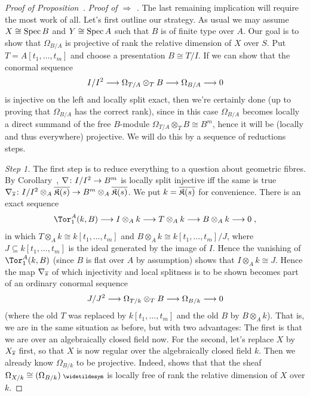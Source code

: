 \documentclass[a4paper,parskip=half,numbers=enddot, DIV=12]{scrreprt}
\begin{document}
\begin{proof}[Proof of Proposition~]
	\emph{Proof of  $\Rightarrow$ .} The last remaining implication will require the most work of all. Let's first outline our strategy. As usual we may assume $X\cong \operatorname{Spec} B$ and $Y\cong \operatorname{Spec} A$ such that $B$ is of finite type over $A$. Our goal is to show that $\Omega_{B/A}$ is projective of rank the relative dimension of $X$ over $S$. Put $T=A[t_1,\ldots,t_m]$ and choose a presentation $B\cong T/I$. If we can show that the conormal sequence
	\begin{align}\lbl{eq:conormalSeq}
		I/I^2\morphism \Omega_{T/A}\otimes_TB\morphism\Omega_{B/A}\morphism 0
	\end{align}
	is injective on the left and locally split exact, then we're certainly done (up to proving that $\Omega_{B/A}$ has the correct rank), since in this case $\Omega_{B/A}$ becomes locally a direct summand of the free $B$-module $\Omega_{T/A}\otimes_TB\cong B^m$, hence it will be (locally and thus everywhere) projective. We will do this by a sequence of reductions steps.
	
	\emph{Step 1.} The first step is to reduce everything to a question about geometric fibres. By Corollary~, $\nabla\colon I/I^2\morphism B^m$ is locally split injective iff the same is true $\nabla_{\ov{s}}\colon I/I^2\otimes_A\ov{\KK(s)}\morphism B^m\otimes_A\ov{\KK(s)}$. We put $k=\overline{\mathfrak{K}(s)}$ for convenience. There is an exact sequence
	\begin{align*}
		\Tor_1^A(k,B)\morphism I\otimes_Ak\morphism T\otimes_Ak\morphism B\otimes_Ak\morphism 0\;,
	\end{align*}
	in which $T\otimes_Ak\cong k[t_1,\ldots,t_m]$ and $B\otimes_Ak\cong k[t_1,\ldots,t_m]/J$, where $J\subseteq k[t_1,\ldots,t_m]$ is the ideal generated by the image of $I$. Hence the vanishing of $\Tor_1^A(k,B)$ (since $B$ is flat over $A$ by assumption) shows that $I\otimes_Ak\cong J$. Hence the map $\nabla_{\overline{s}}$ of which injectivity and local splitness is to be shown becomes part of an ordinary conormal sequence
	\begin{align}\lbl{eq:conormalSeq2}
		J/J^2\morphism \Omega_{T/k}\otimes_TB\morphism \Omega_{B/k}\morphism 0
	\end{align}
	 (where the old $T$ was replaced by $k[t_1,\ldots,t_m]$ and the old $B$ by $B\otimes_A k$). That is, we are in the same situation as before, but with two advantages: The first is that we are over an algebraically closed field now. For the second, let's replace $X$ by $X_{\overline{s}}$ first, so that $X$ is now regular over the algebraically closed field $k$. Then we already know $\Omega_{B/k}$ to be projective. Indeed, \cite[Proposition~1.6.3]{alg2} shows that that the sheaf $\Omega_{X/k}\cong (\Omega_{B/k})^\qcmod$ is locally free of rank the relative dimension of $X$ over $k$.
	 

\end{proof}
\end{document}
